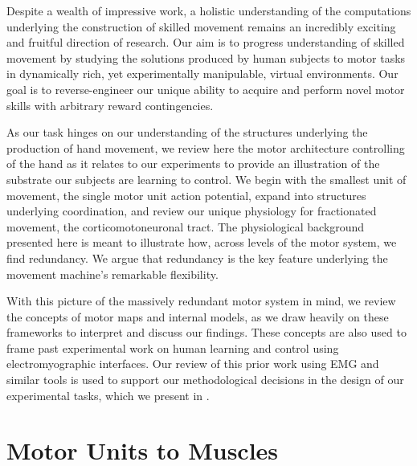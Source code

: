 \documentclass[../main.tex]{subfiles}
\begin{document}
Despite a wealth of impressive work, a holistic understanding of the computations underlying the construction of skilled movement remains an incredibly exciting and fruitful direction of research. Our aim is to progress understanding of skilled movement by studying the solutions produced by human subjects to motor tasks in dynamically rich, yet experimentally manipulable, virtual environments. Our goal is to reverse-engineer our unique ability to acquire and perform novel motor skills with arbitrary reward contingencies.

As our task hinges on our understanding of the structures underlying the production of hand movement, we review here the motor architecture controlling of the hand as it relates to our experiments to provide an illustration of the substrate our subjects are learning to control. We begin with the smallest unit of movement, the single motor unit action potential, expand into structures underlying coordination, and review our unique physiology for fractionated movement, the corticomotoneuronal tract. The physiological background presented here is meant to illustrate how, across levels of the motor system, we find redundancy. We argue that redundancy is the key feature underlying the movement machine's remarkable flexibility.

With this picture of the massively redundant motor system in mind, we review the concepts of motor maps and internal models, as we draw heavily on these frameworks to interpret and discuss our findings. These concepts are also used to frame past experimental work on human learning and control using electromyographic interfaces. Our review of this prior work using EMG and similar tools is used to support our methodological decisions in the design of our experimental tasks, which we present in . 



\section{Motor Units to Muscles}\label{motor-units-to-muscles}
\end{document}
